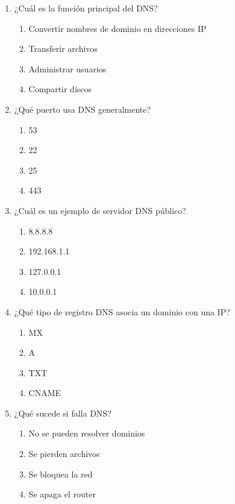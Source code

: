 \documentclass[12pt]{article}
\begin{document}
\begin{enumerate}[label=\textbf{DNS-\arabic*.}]

\item ¿Cuál es la función principal del DNS?
\begin{enumerate}[label=\alph*)]
\item Convertir nombres de dominio en direcciones IP
\item Transferir archivos
\item Administrar usuarios
\item Compartir discos
\end{enumerate}

\item ¿Qué puerto usa DNS generalmente?
\begin{enumerate}[label=\alph*)]
\item 53
\item 22
\item 25
\item 443
\end{enumerate}

\item ¿Cuál es un ejemplo de servidor DNS público?
\begin{enumerate}[label=\alph*)]
\item 8.8.8.8
\item 192.168.1.1
\item 127.0.0.1
\item 10.0.0.1
\end{enumerate}

\item ¿Qué tipo de registro DNS asocia un dominio con una IP?
\begin{enumerate}[label=\alph*)]
\item MX
\item A
\item TXT
\item CNAME
\end{enumerate}

\item ¿Qué sucede si falla DNS?
\begin{enumerate}[label=\alph*)]
\item No se pueden resolver dominios
\item Se pierden archivos
\item Se bloquea la red
\item Se apaga el router
\end{enumerate}

\end{enumerate}
\end{document}
